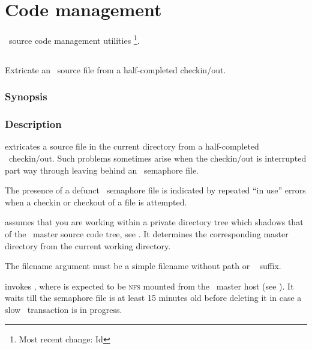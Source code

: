 \chapter{Code management}
\label{Code management}

\aipspp\ source code management utilities \footnote{Most recent change:
$ $Id$ $}.


\section{}
\label{ae}

Extricate an \aipspp\ source file from a half-completed checkin/out.

\subsection*{Synopsis}

\begin{synopsis}
\end{synopsis}

\subsection*{Description}

 extricates a source file in the current directory from a
half-completed \rcs\ checkin/out.  Such problems sometimes arise when the
checkin/out is interrupted part way through leaving behind an \rcs\ semaphore
file.

The presence of a defunct \rcs\ semaphore file is indicated by repeated
``in use'' errors when a checkin or checkout of a file is attempted.

 assumes that you are working within a private directory tree which
shadows that of the \aipspp\ master source code tree, see .
It determines the corresponding master directory from the current working
directory.

The filename argument must be a simple filename without path or \rcs\ 
 suffix.

 invokes , where  is
expected to be \textsc{nfs} mounted from the \aipspp\ master host (see
\sref{RCS directories}).  It waits till the semaphore file is at least 15
minutes old before deleting it in case a slow \rcs\ transaction is in
progress.


